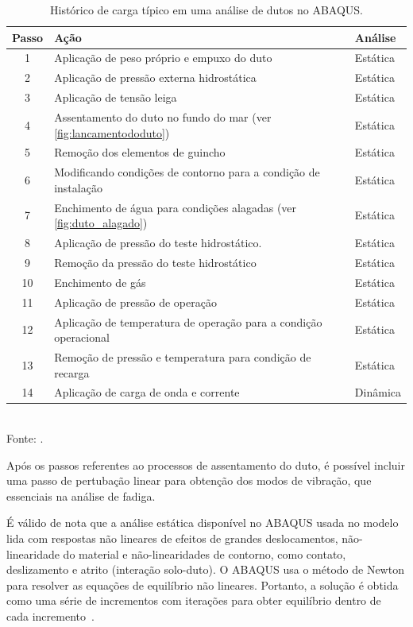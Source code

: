 \begin{table}[!ht]
\renewcommand{\arraystretch}{1.2}
\small
\centering
\caption{Histórico de carga típico em uma análise de dutos no ABAQUS.}\label{tab:load_steps}
\begin{tabular}{cll}
\toprule[1.5pt]

\textbf{Passo} & \textbf{Ação} & \textbf{Análise} \\
\midrule
1 & Aplicação de peso próprio e empuxo do duto & Estática \\
2 & Aplicação de pressão externa hidrostática & Estática \\
3 & Aplicação de tensão leiga & Estática \\
4 & Assentamento do duto no fundo do mar (ver \autoref{fig:lancamentododuto}) & Estática \\
5 & Remoção dos elementos de guincho & Estática \\
6 & Modificando condições de contorno para a condição de instalação & Estática \\
7 & Enchimento de água para condições alagadas (ver \autoref{fig:duto_alagado}) & Estática \\
8 & Aplicação de pressão do teste hidrostático. & Estática \\
9 & Remoção da pressão do teste hidrostático & Estática \\
10 & Enchimento de gás & Estática \\
11 & Aplicação de pressão de operação & Estática \\
12 & Aplicação de temperatura de operação para a condição operacional & Estática \\
13 & Remoção de pressão e temperatura para condição de recarga & Estática \\
14 & Aplicação de carga de onda e corrente & Dinâmica \\

\bottomrule[1.25pt]
\end{tabular}
\\[6pt]
Fonte: .
\end{table}

Após os passos referentes ao processos de assentamento do duto, é possível incluir uma passo de pertubação linear para obtenção dos modos de vibração, que essenciais na análise de fadiga.

É válido de nota que a análise estática disponível no ABAQUS usada no modelo lida com respostas não lineares de efeitos de grandes deslocamentos, não-linearidade do material e não-linearidades de contorno, como contato, deslizamento e atrito (interação solo-duto). O ABAQUS usa o método de Newton para resolver as equações de equilíbrio não lineares. Portanto, a solução é obtida como uma série de incrementos com iterações para obter equilíbrio dentro de cada incremento~\cite{SIMULIA2018}.

